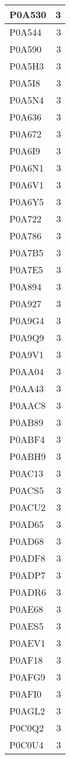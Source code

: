 \documentclass[
]{book}
\theoremstyle{definition}
\theoremstyle{definition}
\theoremstyle{definition}
\theoremstyle{definition}
\theoremstyle{remark}
\begin{document}
\begin{table}
\begin{tabular}{l|r}
\hline
P0A530 & 3\\
\hline
P0A544 & 3\\
\hline
P0A590 & 3\\
\hline
P0A5H3 & 3\\
\hline
P0A5I8 & 3\\
\hline
P0A5N4 & 3\\
\hline
P0A636 & 3\\
\hline
P0A672 & 3\\
\hline
P0A6I9 & 3\\
\hline
P0A6N1 & 3\\
\hline
P0A6V1 & 3\\
\hline
P0A6Y5 & 3\\
\hline
P0A722 & 3\\
\hline
P0A786 & 3\\
\hline
P0A7B5 & 3\\
\hline
P0A7E5 & 3\\
\hline
P0A894 & 3\\
\hline
P0A927 & 3\\
\hline
P0A9G4 & 3\\
\hline
P0A9Q9 & 3\\
\hline
P0A9V1 & 3\\
\hline
P0AA04 & 3\\
\hline
P0AA43 & 3\\
\hline
P0AAC8 & 3\\
\hline
P0AB89 & 3\\
\hline
P0ABF4 & 3\\
\hline
P0ABH9 & 3\\
\hline
P0AC13 & 3\\
\hline
P0ACS5 & 3\\
\hline
P0ACU2 & 3\\
\hline
P0AD65 & 3\\
\hline
P0AD68 & 3\\
\hline
P0ADF8 & 3\\
\hline
P0ADP7 & 3\\
\hline
P0ADR6 & 3\\
\hline
P0AE68 & 3\\
\hline
P0AES5 & 3\\
\hline
P0AEV1 & 3\\
\hline
P0AF18 & 3\\
\hline
P0AFG9 & 3\\
\hline
P0AFI0 & 3\\
\hline
P0AGL2 & 3\\
\hline
P0C0Q2 & 3\\
\hline
P0C0U4 & 3\\

\end{tabular}
\end{table}
\end{document}

